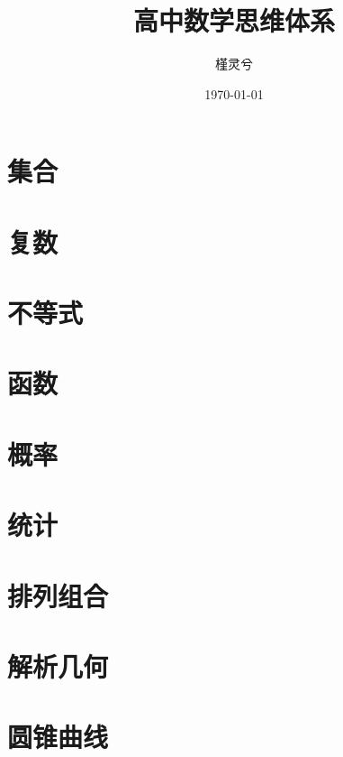 \documentclass[12pt,UTF-8]{MathCyclus_book}
\title{高中数学思维体系}
\author{槿灵兮}
\date{\today}
\begin{document}
\thispagestyle{nohf}




\thispagestyle{nohf}
\clearpage
\tableofcontents
\thispagestyle{nohf}
\newpage

\setcounter{page}{1}

\chapter{集合}


\chapter{复数}


\chapter{不等式}


\chapter{函数}


\chapter{概率}


\chapter{统计}


\chapter{排列组合}


\chapter{解析几何}


\chapter{圆锥曲线}

\end{document}
